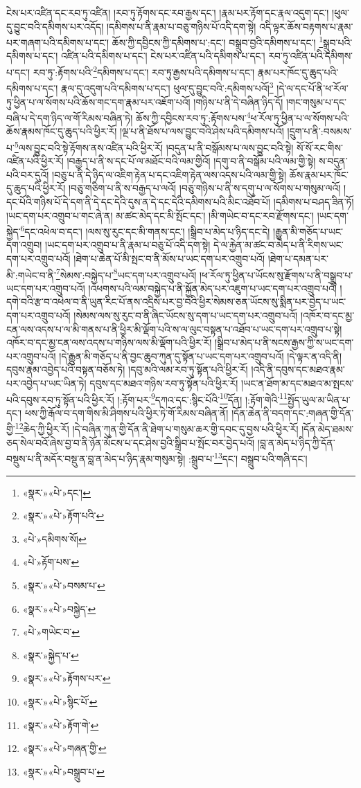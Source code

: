 ངེས་པར་འཛིན་དང་རབ་ཏུ་འཛིན། །རབ་ཏུ་རྟོགས་དང་རབ་རྒྱས་དང་། །རྣམ་པར་རྟོག་དང་རྣལ་འདུག་དང་། །ཕུལ་དུ་བྱུང་བའི་དམིགས་པར་འདོད། །དམིགས་པ་ནི་རྣམ་པ་བཅུ་གཉིས་པོ་འདི་དག་སྟེ། འདི་ལྟར་ཆོས་བརྟགས་པ་རྣམ་པར་གཞག་པའི་དམིགས་པ་དང་། ཆོས་ཀྱི་དབྱིངས་ཀྱི་དམིགས་པ་:དང་། བསྒྲུབ་བྱའི་དམིགས་པ་དང་། \footnote{«སྣར་»«པེ་»དང་།  }སྒྲུབ་པའི་དམིགས་པ་དང་། འཛིན་པའི་དམིགས་པ་དང་། ངེས་པར་འཛིན་པའི་དམིགས་པ་དང་། རབ་ཏུ་འཛིན་པའི་དམིགས་པ་དང་། རབ་ཏུ་:རྟོགས་པའི་\footnote{«སྣར་»«པེ་»རྟོག་པའི་}དམིགས་པ་དང་། རབ་ཏུ་རྒྱས་པའི་དམིགས་པ་དང་། རྣམ་པར་ཁོང་དུ་ཆུད་པའི་དམིགས་པ་དང་། རྣལ་དུ་འདུག་པའི་དམིགས་པ་དང་། ཕུལ་དུ་བྱུང་བའི་:དམིགས་པའོ།\footnote{«པེ་»དམིགས་སོ།} །དེ་ལ་དང་པོ་ནི་ཕ་རོལ་ཏུ་ཕྱིན་པ་ལ་སོགས་པའི་ཆོས་གང་དག་རྣམ་པར་འཇོག་པའོ། །གཉིས་པ་ནི་དེ་བཞིན་ཉིད་དོ། །གང་གསུམ་པ་དང་བཞི་པ་དེ་དག་ཉིད་ལ་གོ་རིམས་བཞིན་ཏེ། ཆོས་ཀྱི་དབྱིངས་རབ་ཏུ་:རྟོགས་པས་\footnote{«པེ་»རྟོག་པས་}ཕ་རོལ་ཏུ་ཕྱིན་པ་ལ་སོགས་པའི་ཆོས་རྣམས་ཁོང་དུ་ཆུད་པའི་ཕྱིར་རོ། །ལྔ་པ་ནི་ཐོས་པ་ལས་བྱུང་བའི་ཤེས་པའི་དམིགས་པའོ། །དྲུག་པ་ནི་:བསམས་པ་\footnote{«སྣར་»«པེ་»བསམ་པ་}ལས་བྱུང་བའི་སྟེ་རྟོགས་ནས་འཛིན་པའི་ཕྱིར་རོ། །བདུན་པ་ནི་བསྒོམས་པ་ལས་བྱུང་བའི་སྟེ། སོ་སོ་རང་གིས་འཛིན་པའི་ཕྱིར་རོ། །བརྒྱད་པ་ནི་ས་དང་པོ་ལ་མཐོང་བའི་ལམ་གྱིའོ། །དགུ་བ་ནི་བསྒོམ་པའི་ལམ་གྱི་སྟེ། ས་བདུན་པའི་བར་དུའོ། །བཅུ་པ་ནི་དེ་ཉིད་ལ་འཇིག་རྟེན་པ་དང་འཇིག་རྟེན་ལས་འདས་པའི་ལམ་གྱི་སྟེ། ཆོས་རྣམ་པར་ཁོང་དུ་ཆུད་པའི་ཕྱིར་རོ། །བཅུ་གཅིག་པ་ནི་ས་བརྒྱད་པ་ལའོ། །བཅུ་གཉིས་པ་ནི་ས་དགུ་པ་ལ་སོགས་པ་གསུམ་ལའོ། །དང་པོའི་གཉིས་པོ་དེ་དག་ནི་དེ་དང་དེའི་དུས་ན་དེ་དང་དེའི་དམིགས་པའི་མིང་འཐོབ་པོ། །དམིགས་པ་བཤད་ཟིན་ཏོ། །ཡང་དག་པར་འགྲུབ་པ་གང་ཞེ་ན། མ་ཚང་མེད་དང་མི་སྤོང་དང་། །མི་གཡེང་བ་དང་རབ་རྫོགས་དང་། །ཡང་དག་སྐྱེད་\footnote{«སྣར་»«པེ་»བསྐྱེད་}དང་འཕེལ་བ་དང་། །ལས་སུ་རུང་དང་མི་གནས་དང་། །སྒྲིབ་པ་མེད་པ་ཉིད་དང་དེ། །རྒྱུན་མི་གཅོད་པ་ཡང་དག་འགྲུབ། །ཡང་དག་པར་འགྲུབ་པ་ནི་རྣམ་པ་བཅུ་པོ་འདི་དག་སྟེ། དེ་ལ་རྐྱེན་མ་ཚང་བ་མེད་པ་ནི་རིགས་ཡང་དག་པར་འགྲུབ་པའོ། །ཐེག་པ་ཆེན་པོ་མི་སྤང་བ་ནི་མོས་པ་ཡང་དག་པར་འགྲུབ་པའོ། །ཐེག་པ་དམན་པར་མི་:གཡེང་བ་ནི་\footnote{«པེ་»གཡེང་བ་}སེམས་:བསྐྱེད་པ་\footnote{«སྣར་»སྐྱེད་པ་}ཡང་དག་པར་འགྲུབ་པའོ། །ཕ་རོལ་ཏུ་ཕྱིན་པ་ཡོངས་སུ་རྫོགས་པ་ནི་བསྒྲུབ་པ་ཡང་དག་པར་འགྲུབ་པའོ། །འཕགས་པའི་ལམ་བསྐྱེད་པ་ནི་སྐྱོན་མེད་པར་འཇུག་པ་ཡང་དག་པར་འགྲུབ་པའོ། །དགེ་བའི་རྩ་བ་འཕེལ་བ་ནི་ཡུན་རིང་པོ་ནས་འདྲིས་པར་བྱ་བའི་ཕྱིར་སེམས་ཅན་ཡོངས་སུ་སྨིན་པར་བྱེད་པ་ཡང་དག་པར་འགྲུབ་པའོ། །སེམས་ལས་སུ་རུང་བ་ནི་ཞིང་ཡོངས་སུ་དག་པ་ཡང་དག་པར་འགྲུབ་པའོ། །འཁོར་བ་དང་མྱ་ངན་ལས་འདས་པ་ལ་མི་གནས་པ་ནི་ཕྱིར་མི་ལྡོག་པའི་ས་ལ་ལུང་བསྟན་པ་འཐོབ་པ་ཡང་དག་པར་འགྲུབ་པ་སྟེ། འཁོར་བ་དང་མྱ་ངན་ལས་འདས་པ་གཉིས་ལས་མི་ལྡོག་པའི་ཕྱིར་རོ། །སྒྲིབ་པ་མེད་པ་ནི་སངས་རྒྱས་ཀྱི་ས་ཡང་དག་པར་འགྲུབ་པའོ། །དེ་རྒྱུན་མི་གཅོད་པ་ནི་བྱང་ཆུབ་ཀུན་དུ་སྟོན་པ་ཡང་དག་པར་འགྲུབ་པའོ། །དེ་ལྟར་ན་འདི་ནི། དབུས་རྣམ་འབྱེད་པའི་བསྟན་བཅོས་ཏེ། །དབུ་མའི་ལམ་རབ་ཏུ་སྟོན་པའི་ཕྱིར་རོ། །འདི་ནི་དབུས་དང་མཐའ་རྣམ་པར་འབྱེད་པ་ཡང་ཡིན་ཏེ། དབུས་དང་མཐའ་གཉིས་རབ་ཏུ་སྟོན་པའི་ཕྱིར་རོ། །ཡང་ན་ཐོག་མ་དང་མཐའ་མ་སྤངས་པའི་དབུས་རབ་ཏུ་སྟོན་པའི་ཕྱིར་རོ། །:རྟོག་པར་\footnote{«སྣར་»«པེ་»རྟོགས་པར་}དཀའ་དང་:སྙིང་པོའི་\footnote{«སྣར་»«པེ་»སྙིང་པོ་}དོན། །:རྟོག་གེའི་\footnote{«སྣར་»«པེ་»རྟོག་གེ་}སྤྱོད་ཡུལ་མ་ཡིན་པ་དང་། ཕས་ཀྱི་རྒོལ་བ་དག་གིས་མི་ཤིགས་པའི་ཕྱིར་ཏེ་གོ་རིམས་བཞིན་ནོ། །དོན་ཆེན་ནི་བདག་དང་:གཞན་གྱི་དོན་གྱི་\footnote{«སྣར་»«པེ་»གཞན་གྱི་}ཆེད་ཀྱི་ཕྱིར་རོ། །དེ་བཞིན་ཀུན་གྱི་དོན་ནི་ཐེག་པ་གསུམ་ཆར་གྱི་དབང་དུ་བྱས་པའི་ཕྱིར་རོ། །དོན་མེད་ཐམས་ཅད་སེལ་བའོ་ཞེས་བྱ་བ་ནི་ཉོན་མོངས་པ་དང་ཤེས་བྱའི་སྒྲིབ་པ་སྤོང་བར་བྱེད་པའོ། །བླ་ན་མེད་པ་ཉིད་ཀྱི་དོན་བསྡུས་པ་ནི་མདོར་བསྡུ་ན་བླ་ན་མེད་པ་ཉིད་རྣམ་གསུམ་སྟེ། :སྒྲུབ་པ་\footnote{«སྣར་»«པེ་»བསྒྲུབ་པ་}དང་། བསྒྲུབ་པའི་གཞི་དང་། 